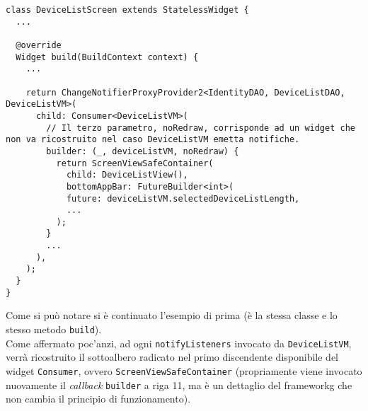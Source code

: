 \begin{lstlisting}
class DeviceListScreen extends StatelessWidget {
  ...

  @override
  Widget build(BuildContext context) {
    ...
  
    return ChangeNotifierProxyProvider2<IdentityDAO, DeviceListDAO, DeviceListVM>(
      child: Consumer<DeviceListVM>(
        // Il terzo parametro, noRedraw, corrisponde ad un widget che non va ricostruito nel caso DeviceListVM emetta notifiche.
        builder: (_, deviceListVM, noRedraw) {
          return ScreenViewSafeContainer(
            child: DeviceListView(),
            bottomAppBar: FutureBuilder<int>(
            future: deviceListVM.selectedDeviceListLength,
            ...
          );
        }
        ...
      ),
    );
  }
}
\end{lstlisting}
Come si può notare si è continuato l'esempio di prima (è la stessa classe e lo stesso metodo \texttt{build}).\\
Come affermato poc'anzi, ad ogni \texttt{notifyListeners} invocato da \texttt{DeviceListVM}, verrà ricostruito il sottoalbero radicato nel primo discendente disponibile del widget \texttt{Consumer}, ovvero \texttt{ScreenViewSafeContainer} (propriamente viene invocato nuovamente il \emph{callback} \texttt{builder} a riga 11, ma è un dettaglio del \gls{frameworkg} che non cambia il principio di funzionamento).